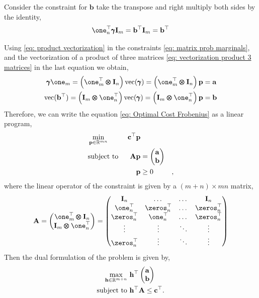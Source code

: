 Consider the constraint for $\mathbf{b}$ take the transpose and right multiply both sides by the identity,
\begin{align*}
	\one_n^\top\pmb{\gamma}\mathbf{I}_m=\mathbf{b}^\top\mathbf{I}_m=\mathbf{b}^\top
\end{align*}

Using \eqref{eq: product vectorization} in the constraints \eqref{eq: matrix prob marginals}, and the vectorization of a product of three matrices \eqref{eq: vectorization product 3 matrices} in the last equation we obtain, 
\begin{align}
	\pmb{\gamma}\one_m=\parentheses{\one_m^\top\pmb{\otimes}\mathbf{I}_n}\mathrm{vec}(\pmb{\gamma})=\parentheses{\one_m^\top\pmb{\otimes}\mathbf{I}_n}\mathbf{p}&=\mathbf{a}\\
	\mathrm{vec}(\mathbf{b}^\top)=\parentheses{\mathbf{I}_m\pmb{\otimes}\one_n^\top}\mathrm{vec}(\pmb{\gamma})=\parentheses{\mathbf{I}_m\pmb{\otimes}\one_n^\top}\mathbf{p}&=\mathbf{b}\label{eq: constrain deduction}
\end{align}
Therefore, we can write the equation  \ref{eq: Optimal Cost Frobenius} as a linear program, 
\begin{align}
	&\min_{\mathbf{p}\in\mathbb{R}^{mn}}\,&\mathbf{c}^\top \mathbf{p} &\\
	&\text{subject to }& \mathbf{Ap}&=\begin{pmatrix}
	\mathbf{a}\\\mathbf{b}
	\end{pmatrix} &\\
	& &\mathbf{p}&\geq 0 &,
\end{align}
where the linear operator of the constraint is given by a $(m+n)\times mn$ matrix,
\begin{equation}
	\mathbf{A}=\begin{pmatrix}
	\one_m^\top \pmb{\otimes} \mathbf{I}_{n}\\
	\mathbf{I}_{m
		}\pmb{\otimes} \one_n^\top 
	\end{pmatrix}=\begin{pmatrix}
	\mathbf{I}_n&\dots &\dots& \mathbf{I}_n\\
	\one_n^\top&\zeros_n^\top &\dots& \zeros_n^\top\\
	\zeros_n^\top&\one_n^\top &\dots& \zeros_n^\top\\
	\vdots&\vdots&\ddots& \vdots\\
	\zeros_n^\top&\vdots&\ddots& \vdots\\
	\end{pmatrix}
\end{equation}
Then the dual formulation of the problem is given by,
\begin{align}
	\max_{\mathbf{h}\in\mathbb{R}^{m+n}}\ &\mathbf{h}^\top\begin{pmatrix}
	\mathbf{a}\\\mathbf{b}
	\end{pmatrix}\\
	\text{subject to }& \mathbf{h}^\top\mathbf{A}\leq \mathbf{c}^\top.
\end{align}
